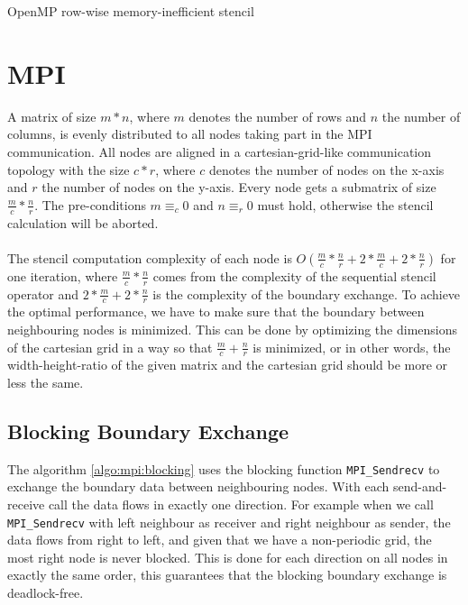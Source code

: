 \documentclass[11pt,a4paper]{article}
\begin{document}
\begin{algorithm}[H] \label{algo:cilk}
 \caption{OpenMP row-wise memory-inefficient stencil}
\end{algorithm}

\section{MPI}
A matrix of size $m * n$, where $m$ denotes the number of rows and $n$ the number of columns, is evenly distributed to all nodes taking part in the MPI communication. All nodes are aligned in a cartesian-grid-like communication topology with the size $c * r$, where $c$ denotes the number of nodes on the x-axis and $r$ the number of nodes on the y-axis. Every node gets a submatrix of size $\tfrac{m}{c} * \tfrac{n}{r}$. The pre-conditions $m \equiv_c 0$ and $n \equiv_r 0$ must hold, otherwise the stencil calculation will be aborted.\\
\\
The stencil computation complexity of each node is $O(\tfrac{m}{c} * \tfrac{n}{r} + 2 * \tfrac{m}{c} + 2 * \tfrac{n}{r})$ for one iteration, where $\tfrac{m}{c} * \tfrac{n}{r}$ comes from the complexity of the sequential stencil operator and $2 * \tfrac{m}{c} + 2 * \tfrac{n}{r}$ is the complexity of the boundary exchange. To achieve the optimal performance, we have to make sure that the boundary between neighbouring nodes is minimized. This can be done by optimizing the dimensions of the cartesian grid in a way so that $\tfrac{m}{c} + \tfrac{n}{r}$ is minimized, or in other words, the width-height-ratio of the given matrix and the cartesian grid should be more or less the same.

\subsection{Blocking Boundary Exchange}
The algorithm \ref{algo:mpi:blocking} uses the blocking function \verb|MPI_Sendrecv| to exchange the boundary data between neighbouring nodes. With each send-and-receive call the data flows in exactly one direction. For example when we call \verb|MPI_Sendrecv| with left neighbour as receiver and right neighbour as sender, the data flows from right to left, and given that we have a non-periodic grid, the most right node is never blocked. This is done for each direction on all nodes in exactly the same order, this guarantees that the blocking boundary exchange is deadlock-free.\\
\end{document}
